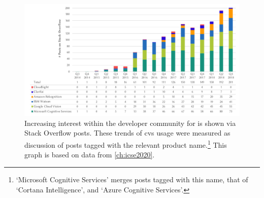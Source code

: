 

\begin{figure}[t!]
\centering
\includegraphics[width=.95\linewidth]{stackoverflow-trends2}
\caption[Increasing interest in the developer community of computer vision services]{Increasing interest within the developer community for  is shown via Stack Overflow posts. These trends of \gls{cvs} usage were measured as discussion of posts tagged with the relevant product name.\footnote{`Microsoft Cognitive Services' merges posts tagged with this name, that of `Cortana Intelligence', and `Azure Cognitive Services'.} This graph is based on data from \cref{ch:icse2020}.}
\label{fig:introduction:stackoverflow-trends}
\end{figure}


